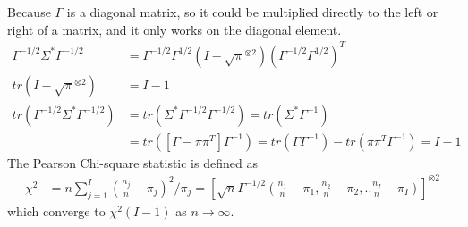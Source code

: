 	Because $\Gamma$ is a diagonal matrix, so it could be multiplied directly to the left or right of a matrix, and it only works on the diagonal element. \\
	\begin{align*}
		\Gamma^{-1/2} \Sigma^{\ast} \Gamma^{-1/2} &= \Gamma^{-1/2} \Gamma^{1/2} (I - \sqrt{\pi}^{\otimes 2}) \left( \Gamma^{-1/2} \Gamma^{1/2} \right)^T\\
		tr(I - \sqrt{\pi}^{\otimes 2}) & = I-1 \\
		tr(\Gamma^{-1/2} \Sigma^{\ast} \Gamma^{-1/2}) &= tr( \Sigma^{\ast} \Gamma^{-1/2} \Gamma^{-1/2}) = tr( \Sigma^{\ast} \Gamma^{-1}) \\
		&= tr( [\Gamma - \pi \pi^T] \Gamma^{-1}) = tr(\Gamma\Gamma^{-1}) - tr(\pi \pi^T \Gamma^{-1}) = I-1
	\end{align*}
	The Pearson Chi-square statistic is defined as
	\begin{align*}
		\chi^2 &= n \sum_{j=1}^I (\frac{n_j}{n} - \pi_j)^2/\pi_j = \left[ \sqrt{n} \Gamma^{-1/2} \left(\frac{n_1}{n} - \pi_1, \frac{n_2}{n} - \pi_2, ..\frac{n_I}{n}-\pi_I \right) \right]^{\otimes 2}
	\end{align*}
	which converge to $\chi^2(I-1)$ as $n \rightarrow \infty$.

